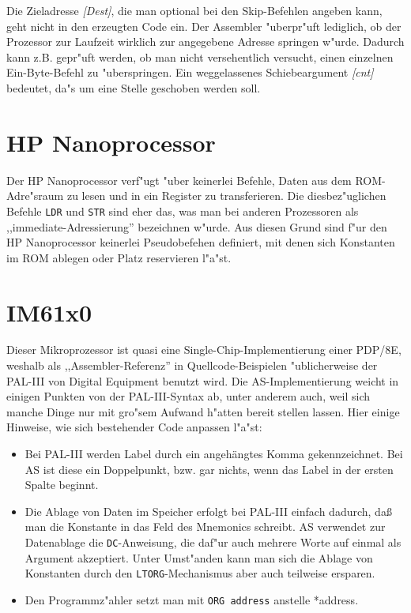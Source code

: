 \documentclass[12pt,a4paper,twoside]{report}
\newcommand{\tty}[1]{{\tt #1}}
\begin{document}
Die Zieladresse {\it [Dest]}, die man optional bei den Skip-Befehlen angeben
kann, geht nicht in den erzeugten Code ein.  Der Assembler "uberpr"uft lediglich,
ob der Prozessor zur Laufzeit wirklich zur angegebene Adresse springen w"urde.
Dadurch kann z.B. gepr"uft werden, ob man nicht versehentlich versucht, einen
einzelnen Ein-Byte-Befehl zu "uberspringen.  Ein weggelassenes Schiebeargument
{\it [cnt]} bedeutet, da"s um eine Stelle geschoben werden soll.


\section{HP Nanoprocessor}

Der HP Nanoprocessor verf"ugt "uber keinerlei Befehle, Daten aus dem ROM-
Adre"sraum zu lesen und in ein Register zu transferieren.  Die diesbez"uglichen
Befehle {\tt LDR} und {\tt STR} sind eher das, was man bei anderen Prozessoren
als ,,immediate-Adressierung'' bezeichnen w"urde.  Aus diesen Grund sind f"ur
den HP Nanoprocessor keinerlei Pseudobefehen definiert, mit denen sich Konstanten
im ROM ablegen oder Platz reservieren l"a"st.


\section{IM61x0}

Dieser Mikroprozessor ist quasi eine Single-Chip-Implementierung einer PDP/8E,
weshalb als ,,Assembler-Referenz'' in Quellcode-Beispielen "ublicherweise der
PAL-III von Digital Equipment benutzt wird.  Die AS-Implementierung weicht in
einigen Punkten von der PAL-III-Syntax ab, unter anderem auch, weil sich manche
Dinge nur mit gro"sem Aufwand h"atten bereit stellen lassen.  Hier einige Hinweise,
wie sich bestehender Code anpassen l"a"st:

\begin{itemize}
\item{Bei PAL-III werden Label durch ein angehängtes Komma gekennzeichnet.
      Bei AS ist diese ein Doppelpunkt, bzw. gar nichts, wenn das Label in der
      ersten Spalte beginnt.}
\item{Die Ablage von Daten im Speicher erfolgt bei PAL-III einfach dadurch,
      daß man die Konstante in das Feld des Mnemonics schreibt.  AS verwendet
      zur Datenablage die \tty{DC}-Anweisung, die daf"ur auch mehrere Worte
      auf einmal als Argument akzeptiert.  Unter Umst"anden kann man sich
      die Ablage von Konstanten durch den \tty{LTORG}-Mechanismus aber auch
      teilweise ersparen.}
\item{Den Programmz"ahler setzt man mit \tty{ORG address} anstelle {*address}.}
\end{itemize}
\end{document}
